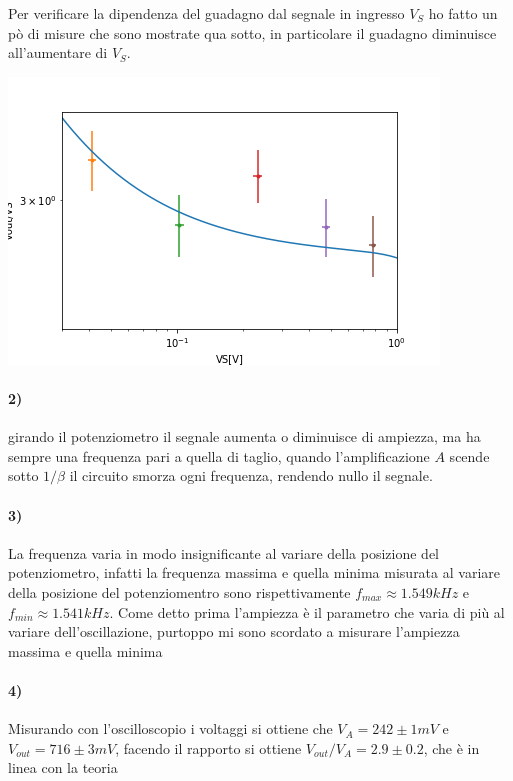 \documentclass{article}
\begin{document}
	Per verificare la dipendenza del guadagno dal segnale in ingresso $V_S$ ho fatto un pò di misure che sono mostrate qua sotto, in particolare il guadagno diminuisce all'aumentare di $V_S$.\newline
	\begin{minipage}{.4\linewidth}
        \centering
        \includegraphics[width=\linewidth]{figure/1b.png}
    \end{minipage}
    \begin{minipage}{.5\linewidth}
        
        \label{tab:124}
    \end{minipage}
\paragraph{2)}
	girando il potenziometro il segnale aumenta o diminuisce di ampiezza, ma ha sempre una frequenza pari a quella di taglio, quando l'amplificazione $A$ scende sotto $1/\beta$ il circuito smorza ogni frequenza, rendendo nullo il segnale.
\paragraph{3)}
	La frequenza varia in modo insignificante al variare della posizione del potenziometro, infatti la frequenza massima e quella minima misurata al variare della posizione del potenziomentro sono rispettivamente $f_{max}\approx1.549 kHz$ e $f_{min}\approx1.541 kHz$.\newline
	Come detto prima l'ampiezza è il parametro che varia di più al variare dell'oscillazione, purtoppo mi sono scordato a misurare l'ampiezza massima e quella minima
\paragraph{4)}
	Misurando con l'oscilloscopio i voltaggi si ottiene che $V_{A}=242\pm1mV$ e $V_{out}=716\pm3mV$, facendo il rapporto si ottiene $V_{out}/V_{A}=2.9\pm0.2$, che è in linea con la teoria
\end{document}
